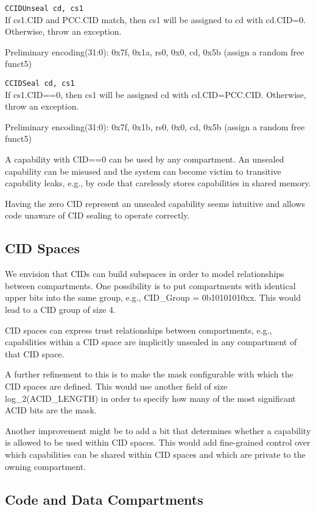 \texttt{CCIDUnseal cd, cs1}\\
If cs1.CID and PCC.CID match, then cs1 will be assigned to cd with cd.CID=0. Otherwise, throw an exception.

Preliminary encoding(31:0): 0x7f, 0x1a, rs0, 0x0, cd, 0x5b (assign a random free funct5)

\texttt{CCIDSeal cd, cs1}\\
If cs1.CID==0, then cs1 will be assigned cd with cd.CID=PCC.CID. Otherwise, throw an exception.

Preliminary encoding(31:0): 0x7f, 0x1b, rs0, 0x0, cd, 0x5b (assign a random free funct5)

A capability with CID==0 can be used by any compartment.
An unsealed capability can be misused and the system can become victim to transitive capability leaks, e.g., by code that carelessly stores capabilities in shared memory.

Having the zero CID represent an unsealed capability seems intuitive and allows code unaware of CID sealing to operate correctly.

\subsection{CID Spaces}
\label{subsec:cid_spaces}

We envision that CIDs can build subspaces in order to model relationships between compartments.
One possibility is to put compartments with identical upper bits into the same group, e.g., CID\_Group = 0b10101010xx.
This would lead to a CID group of size 4.

CID spaces can express trust relationships between compartments, e.g., capabilities within a CID space are implicitly unsealed in any compartment of that CID space.

A further refinement to this is to make the mask configurable with which the CID spaces are defined.
This would use another field of size log\_2(ACID\_LENGTH) in order to specify how many of the most significant ACID bits are the mask.

Another improvement might be to add a bit that determines whether a capability is allowed to be used within CID spaces.
This would add fine-grained control over which capabilities can be shared within CID spaces and which are private to the owning compartment.

\subsection{Code and Data Compartments}

